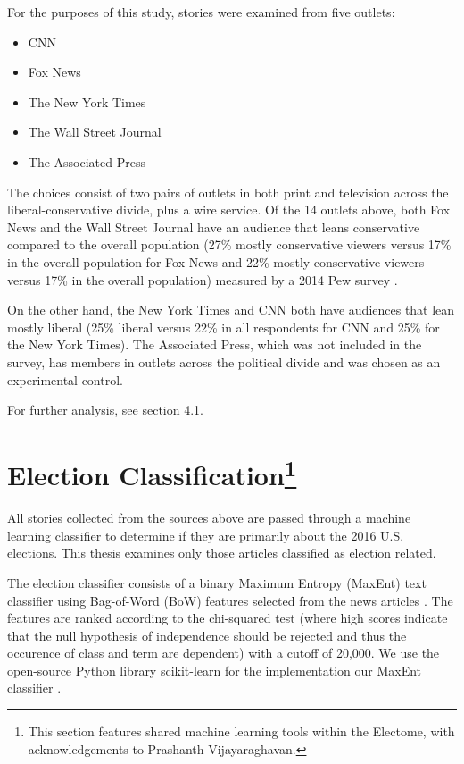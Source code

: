 For the purposes of this study, stories were examined from five outlets: 

\begin{itemize}
\itemsep-1em 
  \item CNN
  \item Fox News  
  \item The New York Times
  \item The Wall Street Journal 
  \item The Associated Press 
\end{itemize}

The choices consist of two pairs of outlets in both print and television across the liberal-conservative divide, plus a wire service. Of the 14 outlets above, both Fox News and the Wall Street Journal have an audience that leans conservative compared to the overall population (27\% mostly conservative viewers versus 17\% in the overall population for Fox News and 22\% mostly conservative viewers versus 17\% in the overall population) measured by a 2014 Pew survey \cite{PoliticalPolarization}.

On the other hand, the New York Times and CNN both have audiences that lean mostly liberal (25\% liberal versus 22\% in all respondents for CNN and 25\% for the New York Times). The Associated Press, which was not included in the survey, has members in outlets across the political divide and was chosen as an experimental control.
 
For further analysis, see section 4.1.

\section[Election Classification] {Election Classification\footnote{This section features shared machine learning tools within the Electome, with acknowledgements to Prashanth Vijayaraghavan.}}

All stories collected from the sources above are passed through a machine learning classifier to determine if they are primarily about the 2016 U.S. elections. This thesis examines only those articles classified as election related.

The election classifier consists of a binary Maximum Entropy (MaxEnt) text classifier using Bag-of-Word (BoW) features selected from the news articles \cite{nigam1999using}. The features are ranked according to the chi-squared test (where high scores indicate that the null hypothesis of independence should be rejected and thus the occurence of class and term are dependent) with a cutoff of 20,000. We use the open-source Python library scikit-learn for the implementation our MaxEnt classifier \cite{pedregosa2011scikit}.  

